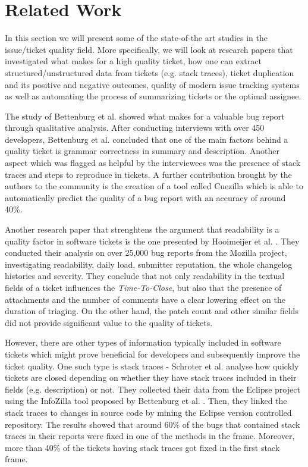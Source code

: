 \documentclass{mpaper}
\begin{document}
\section{Related Work}\label{related_work}

In this section we will present some of the state-of-the art studies in the issue/ticket quality 
field. More specifically, we will look at research papers that investigated what makes for a high quality ticket, 
how one can extract structured/unstructured data from tickets (e.g. stack traces), ticket duplication and its 
positive and negative outcomes, quality of modern issue tracking systems as well as automating the process 
of summarizing tickets or the optimal assignee. 

The study of Bettenburg et al. \cite{bettenburg2008makes} showed what 
makes for a valuable bug report through qualitative analysis. 
After conducting interviews with over 450 developers, Bettenburg et al. concluded that one of the main factors
behind a quality ticket is grammar correctness in summary and description. Another
aspect which was flagged as helpful by the interviewees was the presence of stack 
traces and steps to reproduce in tickets. A further contribution brought by the
authors to the community is the creation of a tool called Cuezilla which is able 
to automatically predict the quality of a bug report with an accuracy of around 40\%.

Another research paper that strenghtens the argument that readability is a quality 
factor in software tickets is the one presented by Hooimeijer et al. \cite{hooimeijer2007modeling}.
They conducted their analysis on over 25,000 bug reports from the Mozilla project, 
investigating readability, daily load, submitter reputation, the whole changelog histories 
and severity. They conclude that not only readability in the textual fields of a ticket
influences the \emph{Time-To-Close}, but also that the presence of attachments and 
the number of comments have a clear lowering effect on the duration of triaging. On the 
other hand, the patch count and other similar fields did not provide significant 
value to the quality of tickets.

However, there are other types of information typically included in software tickets 
which might prove beneficial for developers and subsequently improve the ticket quality.
One such type is stack traces - Schroter et al. \cite{schroter2010stack} analyse how 
quickly tickets are closed depending on whether they have stack traces included in their fields 
(e.g. description) or not. They collected their data from the Eclipse project using 
the InfoZilla tool proposed by Bettenburg et al. \cite{bettenburg2008extracting}.
Then, they linked the stack traces to changes in source code by mining the Eclipse version 
controlled repository. The results showed that 
around 60\% of the bugs that contained stack traces in their reports were fixed
in one of the methods in the frame. Moreover, more than 40\% of the tickets having stack traces
got fixed in the first stack frame.
\end{document}
